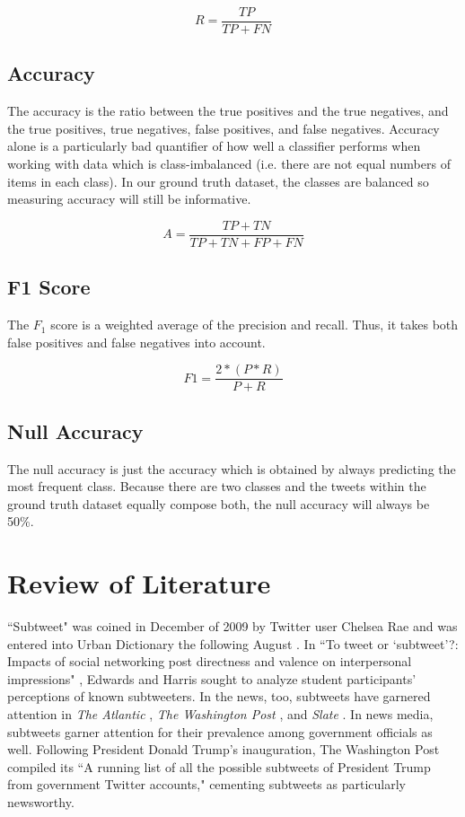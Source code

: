 \documentclass[11pt, twoside, reqno]{book}
\begin{document}
\[R=\frac{TP}{TP+FN}\] 

\subsection{Accuracy}
\label{accuracy}

The accuracy is the ratio between the true positives and the true negatives, and the true positives, true negatives, false positives, and false negatives. Accuracy alone is a particularly bad quantifier of how well a classifier performs when working with data which is class-imbalanced (i.e. there are not equal numbers of items in each class). In our ground truth dataset, the classes are balanced so measuring accuracy will still be informative.

\[A=\frac{TP+TN}{TP+TN+FP+FN}\] 

\subsection{F1 Score}
\label{f1_score}

The $F_{1}$ score is a weighted average of the precision and recall. Thus, it takes both false positives and false negatives into account.

\[F1=\frac{2*(P*R)}{P+R}\] 

\subsection{Null Accuracy}
\label{null_accuracy}

The null accuracy is just the accuracy which is obtained by always predicting the most frequent class. Because there are two classes and the tweets within the ground truth dataset equally compose both, the null accuracy will always be 50\%.

\section{Review of Literature}
\label{review_of_literature}

``Subtweet" was coined in December of 2009 by Twitter user Chelsea Rae \cite{first_subtweet} and was entered into Urban Dictionary the following August \cite{urban_dictionary}. In ``To tweet or ‘subtweet’?: Impacts of social networking post directness and valence on interpersonal impressions" \cite{subtweets_communications}, Edwards and Harris sought to analyze student participants' perceptions of known subtweeters. In the news, too, subtweets have garnered attention in \textit{The Atlantic} \cite{the_atlantic}, \textit{The Washington Post} \cite{the_washington_post}, and \textit{Slate} \cite{slate}. In news media, subtweets garner attention for their prevalence among government officials as well. Following President Donald Trump's inauguration, The Washington Post compiled its ``A running list of all the possible subtweets of President Trump from government Twitter accounts," \cite{the_washington_post_trump} cementing subtweets as particularly newsworthy.
\end{document}
